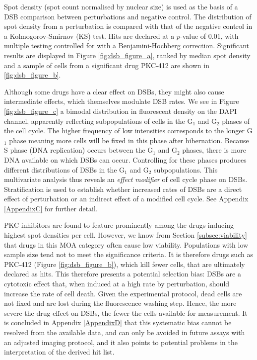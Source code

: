 Spot density (spot count normalised by nuclear size) is used as the basis of a DSB comparison between perturbations and negative control. The distribution of spot density from a perturbation is compared with that of the negative control in a Kolmogorov-Smirnov (KS) test. Hits are declared at a $p$-value of $0.01$, with multiple testing controlled for with a Benjamini-Hochberg correction. Significant results are displayed in Figure \ref{fig:dsb_figure_a}, ranked by median spot density and a sample of cells from a significant drug PKC-412 are shown in \ref{fig:dsb_figure_b}. 

Although some drugs have a clear effect on DSBs, they might also cause intermediate effects, which themselves modulate DSB rates. We see in Figure \ref{fig:dsb_figure_c} a bimodal distribution in fluorescent density on the DAPI channel, apparently reflecting subpopulations of cells in the G$_1$ and G$_2$ phases of the cell cycle. The higher frequency of low intensities corresponds to the longer G$_1$ phase meaning more cells will be fixed in this phase after hibernation. Because S phase (DNA replication) occurs between the G$_1$ and G$_2$ phases, there is more DNA available on which DSBs can occur.  Controlling for these phases produces different distributions of DSBs in the G$_1$ and G$_2$ subpopulations. This multivariate analysis thus reveals an \emph{effect modifier} of cell cycle phase on DSBs. Stratification is used to establish whether increased rates of DSBs are a direct effect of perturbation or an indirect effect of a modified cell cycle. See Appendix \ref{AppendixC} for further detail.

PKC inhibitors are found to feature prominently among the drugs inducing highest spot densities per cell. However, we know from Section \ref{subsec:viability} that drugs in this MOA category often cause low viability. Populations with low sample size tend not to meet the significance criteria. It is therefore drugs such as PKC-412 (Figure \ref{fig:dsb_figure_b}), which kill fewer cells, that are ultimately declared as hits. This therefore presents a potential selection bias: DSBs are a cytotoxic effect that, when induced at a high rate by perturbation, should increase the rate of cell death. Given the experimental protocol, dead cells are not fixed and are lost during the fluorescence washing step. Hence, the more severe the drug effect on DSBs, the fewer the cells available for measurement. It is concluded in Appendix \ref{AppendixD} that this systematic bias cannot be resolved from the available data, and can only be avoided in future assays with an adjusted imaging protocol, and it also points to potential problems in the interpretation of the derived hit list.

